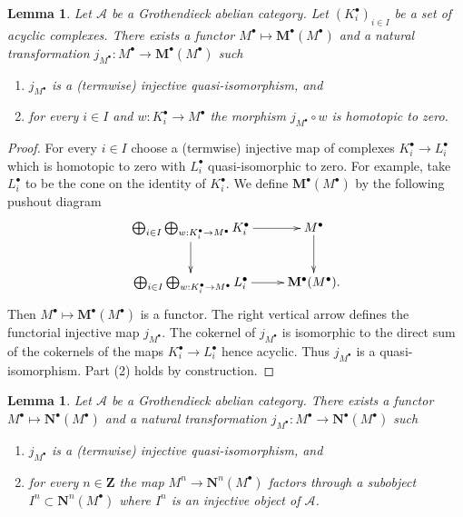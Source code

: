 \documentclass{stacks-project}
\theoremstyle{plain}
\newtheorem{lemma}[subsection]{Lemma}
\theoremstyle{definition}
\theoremstyle{remark}
\numberwithin{equation}{subsection}
\begin{document}
\begin{lemma}
\label{lemma-functorial-homotopies}
Let $\mathcal{A}$ be a Grothendieck abelian category.
Let $(K_i^\bullet)_{i \in I}$ be a set of acyclic complexes.
There exists a functor $M^\bullet \mapsto \mathbf{M}^\bullet(M^\bullet)$
and a natural transformation
$j_{M^\bullet} : M^\bullet \to \mathbf{M}^\bullet(M^\bullet)$
such
\begin{enumerate}
\item $j_{M^\bullet}$ is a (termwise) injective quasi-isomorphism, and
\item for every $i \in I$ and $w : K_i^\bullet \to M^\bullet$
the morphism $j_{M^\bullet} \circ w$ is homotopic to zero.
\end{enumerate}
\end{lemma}

\begin{proof}
For every $i \in I$ choose a (termwise) injective map of complexes
$K_i^\bullet \to L_i^\bullet$ which is homotopic to zero with
$L_i^\bullet$ quasi-isomorphic to zero. For example, take $L_i^\bullet$
to be the cone on the identity of $K_i^\bullet$.
We define $\mathbf{M}^\bullet(M^\bullet)$ by the following pushout diagram
$$
\xymatrix{
\bigoplus_{i \in I}
\bigoplus_{w : K_i^\bullet \to M^\bullet}
K_i^\bullet \ar[r] \ar[d] & M^\bullet \ar[d] \\
\bigoplus_{i \in I}
\bigoplus_{w : K_i^\bullet \to M^\bullet}
L_i^\bullet \ar[r] &  \mathbf{M}^\bullet(M^\bullet).
}
$$
Then $M^\bullet \mapsto \mathbf{M}^\bullet(M^\bullet)$ is a functor. The right
vertical arrow defines the functorial injective map $j_{M^\bullet}$.
The cokernel of $j_{M^\bullet}$ is isomorphic to the direct sum of
the cokernels of the maps $K_i^\bullet \to L_i^\bullet$ hence acyclic.
Thus $j_{M^\bullet}$ is a quasi-isomorphism. Part (2) holds by construction.
\end{proof}

\begin{lemma}
\label{lemma-functorial-injective}
Let $\mathcal{A}$ be a Grothendieck abelian category.
There exists a functor $M^\bullet \mapsto \mathbf{N}^\bullet(M^\bullet)$
and a natural transformation
$j_{M^\bullet} : M^\bullet \to \mathbf{N}^\bullet(M^\bullet)$
such
\begin{enumerate}
\item $j_{M^\bullet}$ is a (termwise) injective quasi-isomorphism, and
\item for every $n \in \mathbf{Z}$ the map $M^n \to \mathbf{N}^n(M^\bullet)$
factors through a subobject $I^n \subset \mathbf{N}^n(M^\bullet)$ where $I^n$
is an injective object of $\mathcal{A}$.
\end{enumerate}
\end{lemma}
\end{document}
